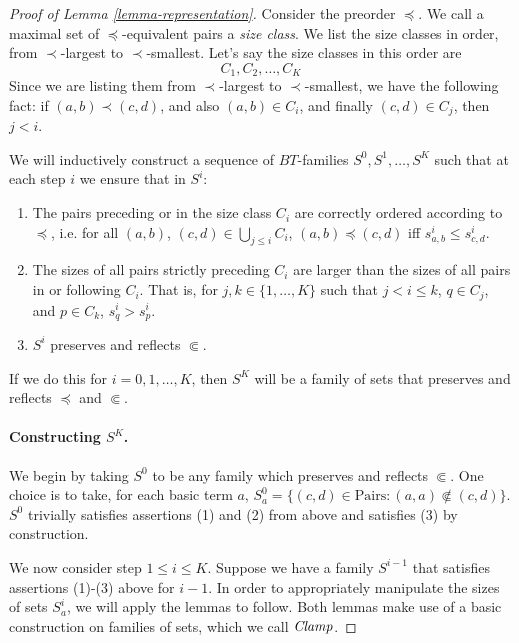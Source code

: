 \documentclass[letterpaper]{article} %
\theoremstyle{definition}
\newcommand{\set}[1]{\{ #1 \}}
\newcommand{\Pairs}{\mbox{Pairs}}
\newcommand{\Clamp}{\protect{\mbox{\textit{Clamp}}}}
\newcommand{\precsubseteq}{\Subset}
\begin{document}
\begin{proof}[Proof of Lemma \ref{lemma-representation}]

Consider the preorder $\preceq$.  We call a maximal set of $\preceq$-equivalent pairs a \emph{size class}.  We list the size classes in order, from  $\prec$-largest to $\prec$-smallest. 
Let's say the size classes in this order are
    \[  C_1, C_2, \ldots, C_K \]
Since we are listing them from 
$\prec$-largest to 
$\prec$-smallest, we have the following fact:
if $(a,b) \prec (c,d)$, and also  $(a,b)\in C_i$, and finally
$(c,d)\in C_j$,
then $j < i$.

We will inductively construct a sequence of $BT$-families $S^0, S^1, \ldots, S^K$ such that at each step $i$ we ensure that in $S^i$:

\begin{enumerate}[(1)]
    \item The pairs preceding or in the size class $C_i$ are correctly ordered according to $\preceq$, i.e. for all $(a,b)$, $(c,d)\in \bigcup_{j\leq i} C_i$,
 $
        (a,b) \preceq  (c,d)$ iff 
        $s^i_{a,b}\leq s^i_{c,d}
        $.
    
    \item The sizes of all pairs strictly preceding $C_i$ are larger than the sizes of all pairs in or following $C_i$.
    That is, for $j, k \in \{1, \ldots, K\}$ such that $j < i \le k$, $q \in C_j$, and $p \in C_k$, $s^i_q > s^i_p$.
    
    \item $S^i$ preserves and reflects $\precsubseteq$.
\end{enumerate}
If we do this for $i = 0, 1, \ldots, K$, then $S^K$ will
be a family of sets that preserves and reflects $\preceq$ and $\precsubseteq$.

\paragraph{Constructing $S^K$.} 
We begin by taking $S^0$ to be any family
which preserves and reflects $\precsubseteq$.
One choice is to take, for each basic term $a$, $S^0_a = \set{(c, d) \in \Pairs : (a, a) \not \precsubseteq (c, d)}$.  $S^0$ trivially satisfies assertions (1) and (2) from above and satisfies (3) by construction.

We now consider step $1 \le i \le K$.  Suppose we have a family $S^{i-1}$ that satisfies assertions (1)-(3) above for $i-1$.  In order to appropriately manipulate the sizes of sets $S^i_a$, we will apply the lemmas to follow.  Both lemmas make use of a basic construction on families of sets, which we call \emph{$\Clamp$}.


\end{proof}
\end{document}
